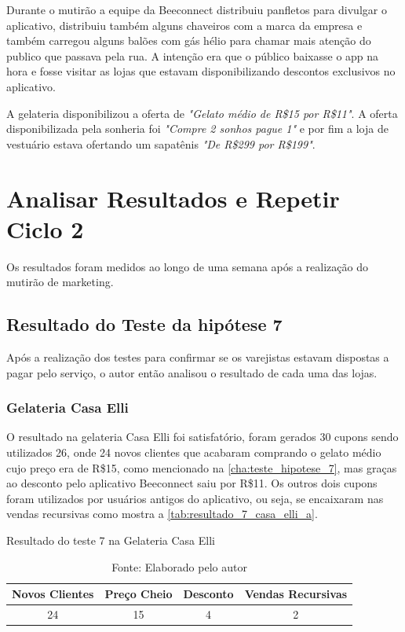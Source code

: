 Durante o mutirão a equipe da Beeconnect distribuiu panfletos para divulgar o aplicativo, distribuiu também alguns chaveiros com a marca da empresa e também carregou alguns balões com gás hélio para chamar mais atenção do publico que passava pela rua. A intenção era que o público baixasse o app na hora e fosse visitar as lojas que estavam disponibilizando descontos exclusivos no aplicativo.

A gelateria disponibilizou a oferta de \textit{"Gelato médio de R\$15 por R\$11"}. A oferta disponibilizada pela sonheria foi \textit{"Compre 2 sonhos pague 1"} e por fim a loja de vestuário estava ofertando um sapatênis \textit{"De R\$299 por R\$199"}.

\section{Analisar Resultados e Repetir Ciclo 2}
\label{cha:analisar_resultados_2}
Os resultados foram medidos ao longo de uma semana após a realização do mutirão de marketing.

\subsection{Resultado do Teste da hipótese 7}
\label{cha:resultado_7}
Após a realização dos testes para confirmar se os varejistas estavam dispostas a pagar pelo serviço, o autor então analisou o resultado de cada uma das lojas.

\subsubsection{Gelateria Casa Elli}
\label{cha:resultado_casa_elli}
O resultado na gelateria Casa Elli foi satisfatório, foram gerados 30 cupons sendo utilizados 26, onde 24 novos clientes que acabaram comprando o gelato médio cujo preço era de R\$15, como mencionado na \autoref{cha:teste_hipotese_7}, mas graças ao desconto pelo aplicativo Beeconnect saiu por R\$11. Os outros dois cupons foram utilizados por usuários antigos do aplicativo, ou seja, se encaixaram nas vendas recursivas como mostra a \autoref{tab:resultado_7_casa_elli_a}.

\begin{table}[H]
\centering
\caption{Resultado do teste 7 na Gelateria Casa Elli}
\label{tab:resultado_7_casa_elli_a}
\begin{tabular}{|c|c|c|c|}
\hline
Novos Clientes & Preço Cheio & Desconto & Vendas Recursivas \\ \hline
24             & 15          & 4        & 2   \\ \hline
\end{tabular}
\caption* {Fonte: Elaborado pelo autor}    
\end{table}

